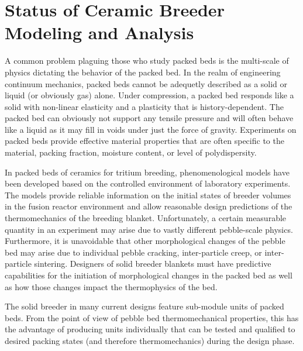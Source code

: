 \chapter{Status of Ceramic Breeder Modeling and Analysis}\label{sec:modeling-state}
A common problem plaguing those who study packed beds is the multi-scale of physics dictating the behavior of the packed bed. In the realm of engineering continuum mechanics, packed beds cannot be adequetly described as a solid or liquid (or obviously gas) alone. Under compression, a packed bed responds like a solid with non-linear elasticity and a plasticity that is history-dependent. The packed bed can obviously not support any tensile pressure and will often behave like a liquid as it may fill in voids under just the force of gravity. Experiments on packed beds provide effective material properties that are often specific to the material, packing fraction, moisture content, or level of polydispersity.

In packed beds of ceramics for tritium breeding, phenomenological models have been developed based on the controlled environment of laboratory experiments. The models provide reliable information on the initial states of breeder volumes in the fusion reactor environment and allow reasonable design predictions of the thermomechanics of the breeding blanket. Unfortunately, a certain measurable quantity in an experiment may arise due to vastly different pebble-scale physics. Furthermore, it is unavoidable that other morphological changes of the pebble bed may arise due to individual pebble cracking, inter-particle creep, or inter-particle sintering. Designers of solid breeder blankets must have predictive capabilities for the initiation of morphological changes in the packed bed as well as how those changes impact the thermophysics of the bed.

The solid breeder in many current designs feature sub-module units of packed beds. From the point of view of pebble bed thermomechanical properties, this has the advantage of producing units individually that can be tested and qualified to desired packing states (and therefore thermomechanics) during the design phase. 



